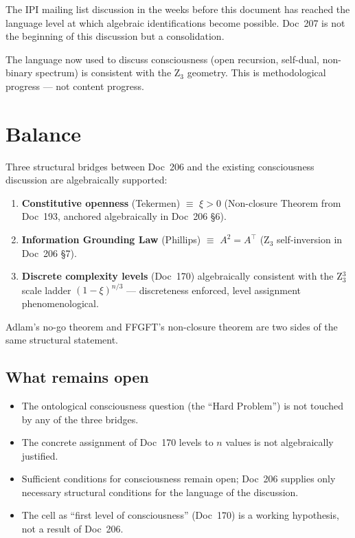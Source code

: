 The IPI mailing list discussion in the weeks before this document has reached the language level at which algebraic identifications become possible. Doc~207 is not the beginning of this discussion but a consolidation.

The language now used to discuss consciousness (open recursion, self-dual, non-binary spectrum) is consistent with the Z$_3$ geometry. This is methodological progress --- not content progress.

\section{Balance}\label{sec:balance}

\begin{conclusionBox}
Three structural bridges between Doc~206 and the existing consciousness discussion are algebraically supported:

\begin{enumerate}
\item \textbf{Constitutive openness} (Tekermen) $\equiv$ $\xi > 0$ (Non-closure Theorem from Doc~193, anchored algebraically in Doc~206 \S6).
\item \textbf{Information Grounding Law} (Phillips) $\equiv$ $A^2 = A^\top$ (Z$_3$ self-inversion in Doc~206 \S7).
\item \textbf{Discrete complexity levels} (Doc~170) algebraically consistent with the Z$_3^3$ scale ladder $(1-\xi)^{n/3}$ --- discreteness enforced, level assignment phenomenological.
\end{enumerate}

Adlam's no-go theorem and FFGFT's non-closure theorem are two sides of the same structural statement.
\end{conclusionBox}

\subsection{What remains open}

\begin{itemize}
\item The ontological consciousness question (the ``Hard Problem'') is not touched by any of the three bridges.
\item The concrete assignment of Doc~170 levels to $n$ values is not algebraically justified.
\item Sufficient conditions for consciousness remain open; Doc~206 supplies only necessary structural conditions for the language of the discussion.
\item The cell as ``first level of consciousness'' (Doc~170) is a working hypothesis, not a result of Doc~206.
\end{itemize}

